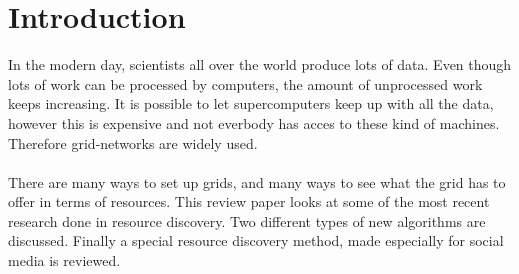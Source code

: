 \section{Introduction}
  In the modern day, scientists all over the world produce lots of data.
  Even though lots of work can be processed by computers, the amount of
  unprocessed work keeps increasing. It is possible to let supercomputers
  keep up with all the data, however this is expensive and not everbody has
  acces to these kind of machines. Therefore grid-networks are widely used.\\
  \\
  There are many ways to set up grids, and many ways to see what the grid
  has to offer in terms of resources. This review paper looks at some of
  the most recent research done in resource discovery. Two different types of
  new algorithms are discussed. Finally a special resource discovery method,
  made especially for social media is reviewed.
  